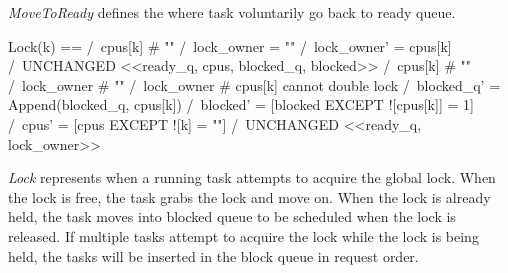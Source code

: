 \textit{MoveToReady} defines the where task voluntarily go back to ready
queue.\newline

\begin{tla}
Lock(k) == 
    \/  /\ cpus[k] # "" 
        /\ lock_owner = ""
        /\ lock_owner' = cpus[k]
        /\ UNCHANGED <<ready_q, cpus, blocked_q, blocked>> 
    \/  /\ cpus[k] # "" 
        /\ lock_owner # ""
        /\ lock_owner # cpus[k] \* cannot double lock
        /\ blocked_q' = Append(blocked_q, cpus[k])
        /\ blocked' = [blocked EXCEPT ![cpus[k]] = 1]
        /\ cpus' = [cpus EXCEPT ![k] = ""]
        /\ UNCHANGED <<ready_q, lock_owner>>
\end{tla}
\begin{tlatex}
%
%
%
%
%
%
%
%
\@xx{}%
\end{tlatex}
\newline

\textit{Lock} represents when a running task attempts to acquire the global
lock. When the lock is free, the task grabs the lock and move on. When the lock 
is already held, the task moves into blocked queue to be scheduled when the lock
is released. If multiple tasks attempt to acquire the lock while the lock is
being held, the tasks will be inserted in the block queue in request order.
\newline

